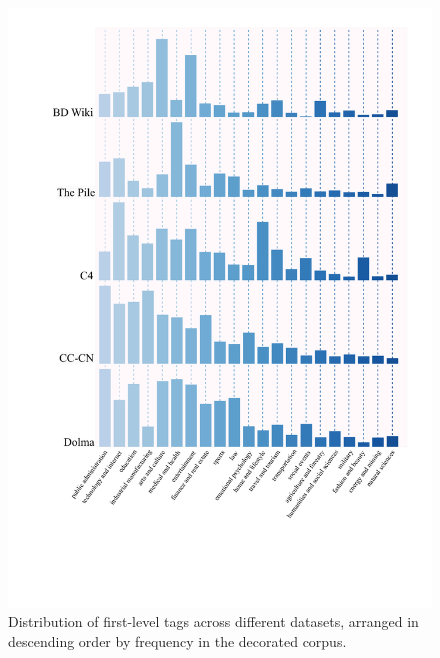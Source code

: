 \documentclass[11pt]{article}
\begin{document}
\begin{figure}[t]
    \centering
    \includegraphics[width=\columnwidth]{figs/dataset_1tag_dis.pdf}
    \caption{Distribution of first-level tags across different datasets, arranged in descending order by frequency in the decorated corpus.}
    \label{fig:enter-label}
\end{figure}
\end{document}
